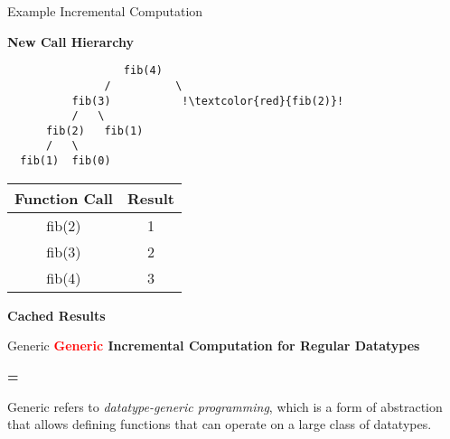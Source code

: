 \begin{slide}{Example Incremental Computation}
\begin{minipage}{.45\textwidth}
\begin{center}
\textbf{New Call Hierarchy}

\vspace*{.7cm}
\begin{verbatim}
                  fib(4)  
               /          \
          fib(3)           !\textcolor{red}{fib(2)}!
          /   \      
      fib(2)   fib(1)
      /   \
  fib(1)  fib(0)
\end{verbatim}
\end{center}
\end{minipage}
\hfill
\begin{minipage}{.45\textwidth}
  \begin{center}
    \begin{table}[h]
      \begin{tabular}{ | c | c | }
        \hline
        \textbf{Function Call} & \textbf{Result} \\ 
        \hline
        fib(2) & 1 \\
        \hline
        fib(3) & 2 \\
        \hline
        fib(4) & 3 \\
        \hline
      \end{tabular}
    \end{table}
    \vspace*{0.7cm}

    \textbf{Cached Results}
  \end{center}
\end{minipage}
\end{slide}


\begin{slide}{Generic}
\centering
\large \textbf{\textcolor{red}{Generic} Incremental Computation for Regular Datatypes}

\vspace*{.5cm}
\textbf{=}
\vspace*{.5cm}

Generic refers to \textit{datatype-generic programming}, which is a form of abstraction that allows defining functions that can operate on a large class of datatypes. 

\end{slide}


